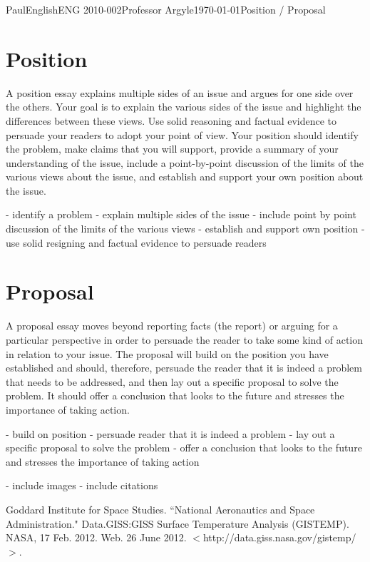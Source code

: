 \documentclass[12pt,letterpaper]{article}
\begin{document}
\begin{mla}{Paul}{English}{ENG 2010-002}{Professor Argyle}{\today}{Position / Proposal}

\section{Position}
A position essay explains multiple sides of an issue and argues for one side over the others.  Your goal is to explain the various sides of the issue and highlight the differences between these views.  Use solid reasoning and factual evidence to persuade your readers to adopt your point of view.  Your position should identify the problem, make claims that you will support, provide a summary of your understanding of the issue, include a point-by-point discussion of the limits of the various views about the issue, and establish and support your own position about the issue.

- identify a problem
- explain multiple sides of the issue
- include point by point discussion of the limits of the various views
- establish and support own position
- use solid resigning and factual evidence to persuade readers

\section{Proposal}
A proposal essay moves beyond reporting facts (the report) or arguing for a particular perspective in order to persuade the reader to take some kind of action in relation to your issue. The proposal will build on the position you have established and should, therefore, persuade the reader that it is indeed a problem that needs to be addressed, and then lay out a specific proposal to solve the problem.  It should offer a conclusion that looks to the future and stresses the importance of taking action.

- build on position
- persuade reader that it is indeed a problem
- lay out a specific proposal to solve the problem
- offer a conclusion that looks to the future and stresses the importance of taking action


- include images
- include citations

\begin{workscited}

\bibent
Goddard Institute for Space Studies. ``National Aeronautics and Space Administration." Data.GISS:GISS Surface Temperature Analysis (GISTEMP). NASA, 17 Feb. 2012. Web. 26 June 2012. $<$http://data.giss.nasa.gov/gistemp/$>$.


\end{workscited}
\end{mla}
\end{document}
